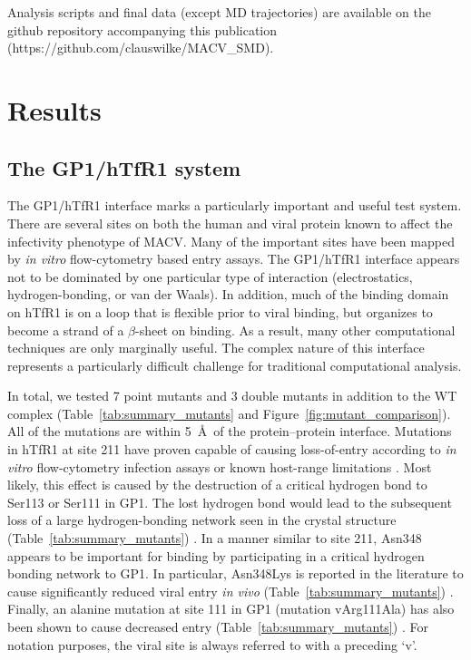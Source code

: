 \documentclass[12pt]{article}
\begin{document}
Analysis scripts and final data (except MD trajectories) are available on the github repository accompanying this publication (https://github.com/clauswilke/MACV\_SMD).

\section{Results}

\subsection{The GP1/hTfR1 system}
The GP1/hTfR1 interface marks a particularly important and useful test system. There are several sites on both the human and viral protein known to affect the infectivity phenotype of MACV. Many of the important sites have been mapped by \textit{in vitro} flow-cytometry based entry assays. The GP1/hTfR1 interface appears not to be dominated by one particular type of interaction (electrostatics, hydrogen-bonding, or van der Waals). In addition, much of the binding domain on hTfR1 is on a loop that is flexible prior to viral binding, but organizes to become a strand of a $\beta$-sheet on binding. As a result,  many other computational techniques \citep{Grant2011,Kortemme2004} are only marginally useful. The complex nature of this interface represents a particularly difficult challenge for traditional computational analysis. 

In total, we tested 7 point mutants and 3 double mutants in addition to the WT complex (Table~\ref{tab:summary_mutants} and Figure~\ref{fig:mutant_comparison}). All of the mutations are within 5~\AA\ of the protein--protein interface. Mutations in hTfR1 at site 211 have proven capable of causing loss-of-entry according to \textit{in vitro} flow-cytometry infection assays or known host-range limitations \citep{Rad2008,Rad20111,Rad20112}. Most likely, this effect is caused by the destruction of a critical hydrogen bond to Ser113 or Ser111 in GP1. The lost hydrogen bond would lead to the subsequent loss of a large hydrogen-bonding network seen in the crystal structure (Table~\ref{tab:summary_mutants}) \citep{Abraham2010}. In a manner similar to site 211, Asn348 appears to be important for binding by participating in a critical hydrogen bonding network \citep{Rad2008,Abraham2010} to GP1. In particular, Asn348Lys is reported in the literature to cause significantly reduced viral entry \textit{in vivo} (Table~\ref{tab:summary_mutants}) \citep{Rad2008,Abraham2010}. Finally, an alanine mutation at site 111 in GP1 (mutation vArg111Ala) has also been shown to cause decreased entry (Table~\ref{tab:summary_mutants}) \citep{Rad20112}. For notation purposes, the viral site is always referred to with a preceding `v'.  
\end{document}
